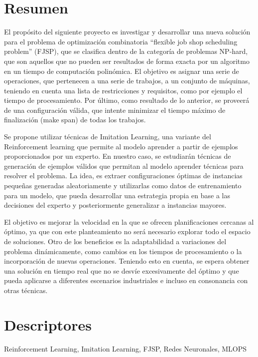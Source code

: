 \section*{Resumen}
El propósito del siguiente proyecto es investigar y desarrollar una nueva solución para el
problema de optimización combinatoria “flexible job shop scheduling problem” (FJSP), que se clasifica dentro
de la categoría de problemas NP-hard, que son aquellos que no pueden ser resultados de forma
exacta por un algoritmo en un tiempo de computación polinómica. El objetivo es asignar una
serie de operaciones, que pertenecen a una serie de trabajos, a un conjunto de máquinas, teniendo en cuenta una lista de restricciones
y requisitos, como por ejemplo el tiempo de procesamiento. Por último, como resultado de lo
anterior, se proveerá de una configuración válida, que intente minimizar el tiempo máximo de
finalización (make span) de todas los trabajos.\medskip

Se propone utilizar técnicas de Imitation Learning, una variante del
Reinforcement learning que permite al modelo aprender a partir de ejemplos
proporcionados por un experto. En nuestro caso, se estudiarán técnicas de
generación de ejemplos válidos que permitan al modelo aprender técnicas para
resolver el problema. La idea, es extraer configuraciones óptimas de instancias
pequeñas generadas aleatoriamente y utilizarlas como datos de entrenamiento
para un modelo, que pueda desarrollar una estrategia propia en base a las
decisiones del experto y posteriormente generalizar a instancias
mayores.\medskip

El objetivo es mejorar la velocidad en la que se ofrecen planificaciones
cercanas al óptimo, ya que con este planteamiento no será necesario explorar
todo el espacio de soluciones. Otro de los beneficios es la adaptabilidad a
variaciones del problema dinámicamente, como cambios en los tiempos de
procesamiento o la incorporación de nuevas operaciones. Teniendo esto en
cuenta, se espera obtener una solución en tiempo real que no se desvíe
excesivamente del óptimo y que pueda aplicarse a diferentes escenarios
industriales e incluso en consonancia con otras técnicas.

\section*{Descriptores}
Reinforcement Learning, Imitation Learning, FJSP, Redes Neuronales, MLOPS
\pagebreak